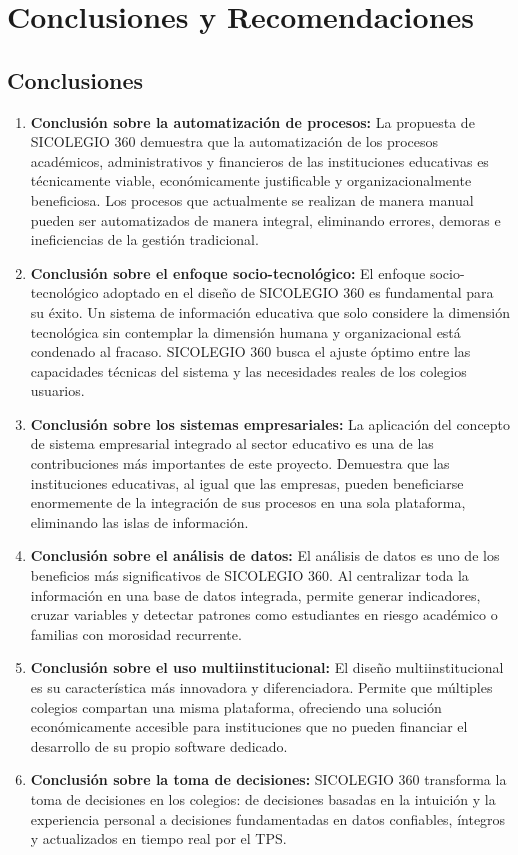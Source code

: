 \documentclass[12pt,a4paper,oneside]{report}
\begin{document}
\chapter{Conclusiones y Recomendaciones}

\section{Conclusiones}

\begin{enumerate}
    \item \textbf{Conclusión sobre la automatización de procesos:} La propuesta de SICOLEGIO 360 demuestra que la automatización de los procesos académicos, administrativos y financieros de las instituciones educativas es técnicamente viable, económicamente justificable y organizacionalmente beneficiosa. Los procesos que actualmente se realizan de manera manual pueden ser automatizados de manera integral, eliminando errores, demoras e ineficiencias de la gestión tradicional.
    \item \textbf{Conclusión sobre el enfoque socio-tecnológico:} El enfoque socio-tecnológico adoptado en el diseño de SICOLEGIO 360 es fundamental para su éxito. Un sistema de información educativa que solo considere la dimensión tecnológica sin contemplar la dimensión humana y organizacional está condenado al fracaso. SICOLEGIO 360 busca el ajuste óptimo entre las capacidades técnicas del sistema y las necesidades reales de los colegios usuarios.
    \item \textbf{Conclusión sobre los sistemas empresariales:} La aplicación del concepto de sistema empresarial integrado al sector educativo es una de las contribuciones más importantes de este proyecto. Demuestra que las instituciones educativas, al igual que las empresas, pueden beneficiarse enormemente de la integración de sus procesos en una sola plataforma, eliminando las islas de información.
    \item \textbf{Conclusión sobre el análisis de datos:} El análisis de datos es uno de los beneficios más significativos de SICOLEGIO 360. Al centralizar toda la información en una base de datos integrada, permite generar indicadores, cruzar variables y detectar patrones como estudiantes en riesgo académico o familias con morosidad recurrente.
    \item \textbf{Conclusión sobre el uso multiinstitucional:} El diseño multiinstitucional es su característica más innovadora y diferenciadora. Permite que múltiples colegios compartan una misma plataforma, ofreciendo una solución económicamente accesible para instituciones que no pueden financiar el desarrollo de su propio software dedicado.
    \item \textbf{Conclusión sobre la toma de decisiones:} SICOLEGIO 360 transforma la toma de decisiones en los colegios: de decisiones basadas en la intuición y la experiencia personal a decisiones fundamentadas en datos confiables, íntegros y actualizados en tiempo real por el TPS.
\end{enumerate}
\end{document}
